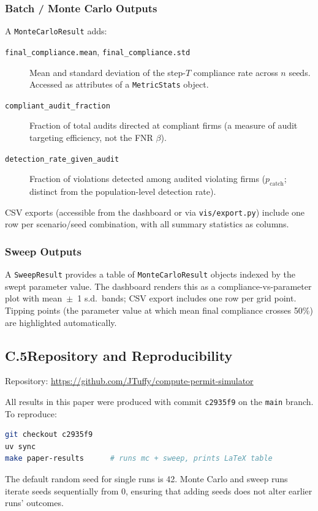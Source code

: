 \subsubsection*{Batch / Monte Carlo Outputs}

A \texttt{MonteCarloResult} adds:

\begin{description}
    \item[\texttt{final\_compliance.mean}, \texttt{final\_compliance.std}] Mean and standard deviation of the step-$T$ compliance rate across $n$ seeds. Accessed as attributes of a \texttt{MetricStats} object.
    \item[\texttt{compliant\_audit\_fraction}] Fraction of total audits directed at compliant firms (a measure of audit targeting efficiency, not the FNR $\beta$).
    \item[\texttt{detection\_rate\_given\_audit}] Fraction of violations detected among audited violating firms ($p_{\mathrm{catch}}$; distinct from the population-level detection rate).
\end{description}

CSV exports (accessible from the dashboard or via \texttt{vis/export.py}) include one row per scenario/seed combination, with all summary statistics as columns.

\subsubsection*{Sweep Outputs}

A \texttt{SweepResult} provides a table of \texttt{MonteCarloResult} objects indexed by the swept parameter value. The dashboard renders this as a compliance-vs-parameter plot with mean~$\pm$~1 s.d.\ bands; CSV export includes one row per grid point. Tipping points (the parameter value at which mean final compliance crosses 50\%) are highlighted automatically.

\subsection*{C.5\quad Repository and Reproducibility}

Repository: \url{https://github.com/JTuffy/compute-permit-simulator}

All results in this paper were produced with commit \texttt{c2935f9} on the \texttt{main} branch. To reproduce:

\begin{lstlisting}[language=bash]
git checkout c2935f9
uv sync
make paper-results      # runs mc + sweep, prints LaTeX table
\end{lstlisting}

The default random seed for single runs is 42. Monte Carlo and sweep runs iterate seeds sequentially from 0, ensuring that adding seeds does not alter earlier runs' outcomes.